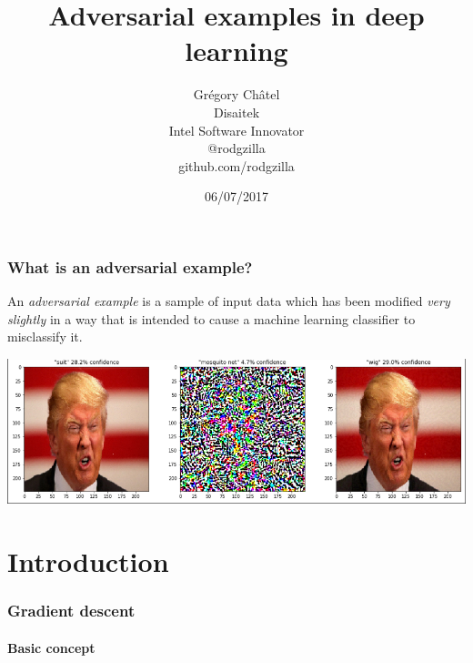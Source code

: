 \documentclass[9pt]{beamer}
\title{Adversarial examples in deep learning}
\author[G. Châtel]{Grégory Châtel\\\vspace{0.3cm}Disaitek\\Intel Software Innovator\\\vspace{0.3cm}@rodgzilla\\github.com/rodgzilla}
\date{06/07/2017}
\begin{document}

\begin{frame}

  \maketitle

\end{frame}

\begin{frame}
  \frametitle{What is an adversarial example?}

  An \emph{adversarial example} is a sample of input data which has
  been modified \emph{very slightly} in a way that is intended to
  cause a machine learning classifier to misclassify it.

  \bigskip

  \pause

  \begin{center}
    \includegraphics[trim={2pt 2pt 2pt 0}, clip, width =
      \linewidth]{images/adversarial_example_wig.png}
  \end{center}

\end{frame}

\section{Introduction}

\begin{frame}
  \frametitle{Gradient descent}

  \framesubtitle{Basic concept}

  \begin{center}
    \scalebox{0.8}{
      
    }
  \end{center}

\end{frame}
\end{document}
